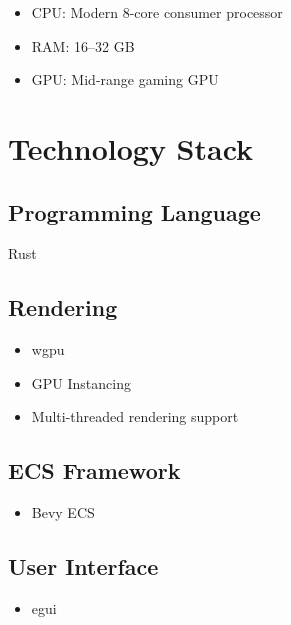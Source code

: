 \documentclass[11pt,a4paper]{article}
\begin{document}
\begin{itemize}

    \item CPU: Modern 8-core consumer processor

    \item RAM: 16--32 GB

    \item GPU: Mid-range gaming GPU

\end{itemize}

\section{Technology Stack}

\subsection{Programming Language}

Rust

\subsection{Rendering}

\begin{itemize}

    \item wgpu

    \item GPU Instancing

    \item Multi-threaded rendering support

\end{itemize}

\subsection{ECS Framework}

\begin{itemize}

    \item Bevy ECS

\end{itemize}

\subsection{User Interface}

\begin{itemize}

    \item egui

\end{itemize}
\end{document}
